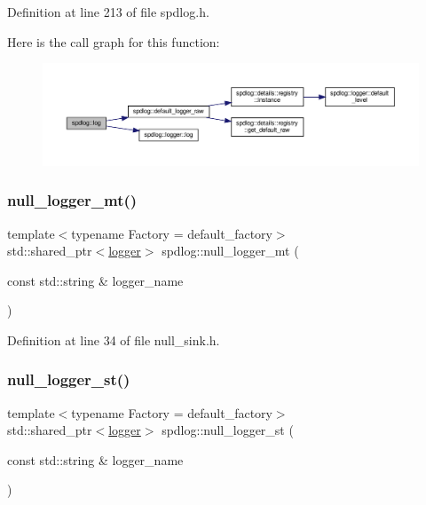 Definition at line 213 of file spdlog.\+h.

Here is the call graph for this function\+:
\nopagebreak
\begin{figure}[H]
\begin{center}
\leavevmode
\includegraphics[width=350pt]{namespacespdlog_aee9d401c7cb3cd8538a139af836c5ec5_cgraph}
\end{center}
\end{figure}
\mbox{\label{namespacespdlog_a6d6344c349d1c6d957d5f21f4387c8f8}} 
\subsubsection{\texorpdfstring{null\+\_\+logger\+\_\+mt()}{null\_logger\_mt()}}
{\footnotesize\ttfamily template$<$typename Factory  = default\+\_\+factory$>$ \\
std\+::shared\+\_\+ptr$<$\hyperlink{classspdlog_1_1logger}{logger}$>$ spdlog\+::null\+\_\+logger\+\_\+mt (\begin{DoxyParamCaption}\item[{const std\+::string \&}]{logger\+\_\+name }\end{DoxyParamCaption})\hspace{0.3cm}{\ttfamily [inline]}}



Definition at line 34 of file null\+\_\+sink.\+h.

\mbox{\label{namespacespdlog_af6a7d6f86b50ab1c5c346949ca5af564}} 
\subsubsection{\texorpdfstring{null\+\_\+logger\+\_\+st()}{null\_logger\_st()}}
{\footnotesize\ttfamily template$<$typename Factory  = default\+\_\+factory$>$ \\
std\+::shared\+\_\+ptr$<$\hyperlink{classspdlog_1_1logger}{logger}$>$ spdlog\+::null\+\_\+logger\+\_\+st (\begin{DoxyParamCaption}\item[{const std\+::string \&}]{logger\+\_\+name }\end{DoxyParamCaption})\hspace{0.3cm}{\ttfamily [inline]}}



